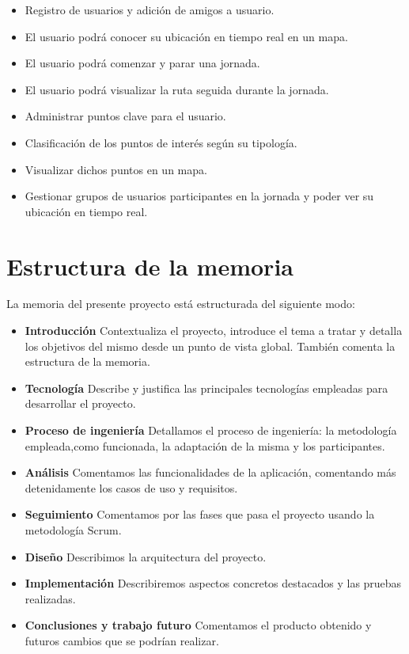 \begin{itemize}
\item Registro de usuarios y adición de amigos a usuario.
\item El usuario podrá conocer su ubicación en tiempo real en un mapa.
\item El usuario podrá comenzar y parar una jornada.
\item El usuario podrá visualizar la ruta seguida durante la jornada.
\item Administrar puntos clave para el usuario.
\item Clasificación de los puntos de interés según su tipología.
\item Visualizar dichos puntos en un mapa.
\item Gestionar grupos de usuarios participantes en la jornada y poder ver su ubicación en tiempo
real.

\end{itemize}


\section{Estructura de la memoria}
La memoria del presente proyecto está estructurada del siguiente modo:

\begin{itemize}
\item \textbf{Introducción} Contextualiza el proyecto, introduce el tema a tratar y detalla los objetivos del mismo desde un punto de vista global.
 También comenta la estructura de la memoria.

\item \textbf{Tecnología} Describe y justifica las principales tecnologías empleadas para desarrollar el proyecto.



\item \textbf{Proceso de ingeniería} Detallamos el proceso de ingeniería: la metodología empleada,como funcionada, la adaptación de la misma y los participantes.


\item \textbf{Análisis} Comentamos las funcionalidades de la aplicación, comentando más detenidamente los casos de uso y requisitos. 
\item \textbf{Seguimiento} Comentamos por las fases que pasa el proyecto usando la metodología Scrum.
\item \textbf{Diseño} Describimos la arquitectura del proyecto.
\item \textbf{Implementación} Describiremos aspectos concretos destacados y las pruebas realizadas.





\item \textbf{Conclusiones y trabajo futuro}
Comentamos el producto obtenido y futuros cambios que se podrían realizar.



\end{itemize}


